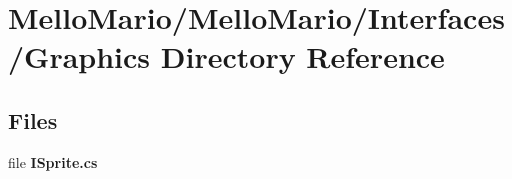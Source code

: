 \section{Mello\+Mario/\+Mello\+Mario/\+Interfaces/\+Graphics Directory Reference}
\label{dir_8233c46af3ef969171d0d38191462f81}
\subsection*{Files}
\begin{DoxyCompactItemize}
\item 
file \textbf{ I\+Sprite.\+cs}
\end{DoxyCompactItemize}
